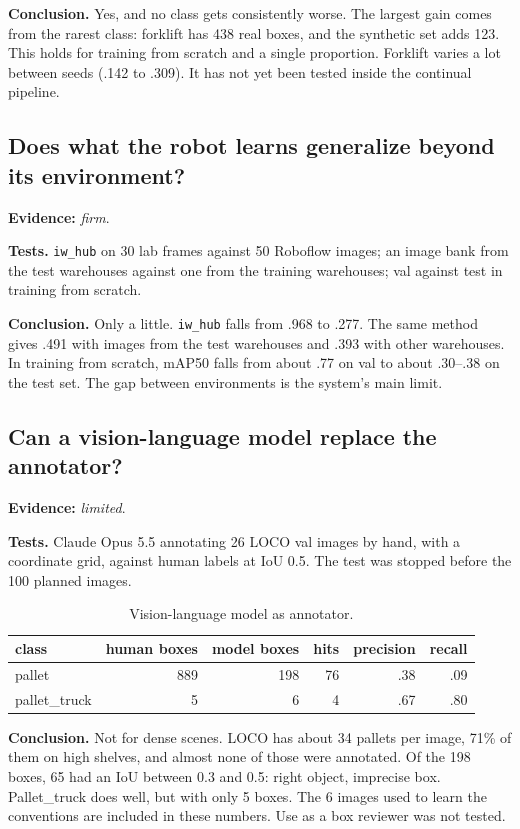 \documentclass[11pt,a4paper]{article}
\newcommand{\evidence}[1]{\noindent\textbf{Evidence:} \emph{#1}.\par}
\newcommand{\tests}{\noindent\textbf{Tests.} }
\newcommand{\conclusion}{\noindent\textbf{Conclusion.} }
\begin{document}
\conclusion Yes, and no class gets consistently worse. The largest gain comes from
the rarest class: forklift has 438 real boxes, and the synthetic set adds 123. This
holds for training from scratch and a single proportion. Forklift varies a lot
between seeds (.142 to .309). It has not yet been tested inside the continual
pipeline.

\subsection{Does what the robot learns generalize beyond its environment?}
\evidence{firm}

\tests \texttt{iw\_hub} on 30 lab frames against 50 Roboflow images; an image bank
from the test warehouses against one from the training warehouses; val against test
in training from scratch.

\conclusion Only a little. \texttt{iw\_hub} falls from .968 to .277. The same method
gives .491 with images from the test warehouses and .393 with other warehouses. In
training from scratch, mAP50 falls from about .77 on val to about .30--.38 on the
test set. The gap between environments is the system's main limit.

\subsection{Can a vision-language model replace the annotator?}
\evidence{limited}

\tests Claude Opus 5.5 annotating 26 LOCO val images by hand, with a coordinate
grid, against human labels at IoU 0.5. The test was stopped before the 100 planned
images.

\begin{table}[H]
\centering\small
\caption{Vision-language model as annotator.}
\begin{tabular}{lrrrrr}
\toprule
class & human boxes & model boxes & hits & precision & recall \\
\midrule
pallet & 889 & 198 & 76 & .38 & .09 \\
pallet\_truck & 5 & 6 & 4 & .67 & .80 \\
\bottomrule
\end{tabular}
\end{table}

\conclusion Not for dense scenes. LOCO has about 34 pallets per image, 71\% of them
on high shelves, and almost none of those were annotated. Of the 198 boxes, 65 had
an IoU between 0.3 and 0.5: right object, imprecise box. Pallet\_truck does well, but
with only 5 boxes. The 6 images used to learn the conventions are included in these
numbers. Use as a box reviewer was not tested.
\end{document}
